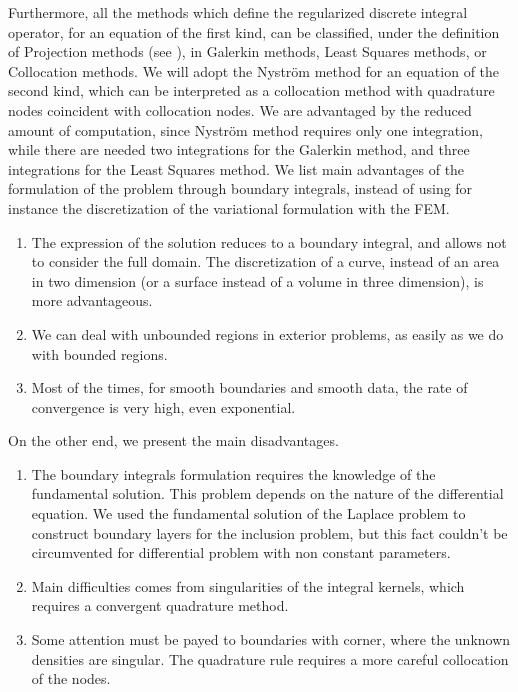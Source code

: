 \documentclass[10pt, a4paper, twoside, openright]{book}
\theoremstyle{definition}
\theoremstyle{plain}
\theoremstyle{plain}
\theoremstyle{plain}
\theoremstyle{plain}
\theoremstyle{plain}
\theoremstyle{plain}
\theoremstyle{plain}
\theoremstyle{plain}
\begin{document}
Furthermore, all the methods which define the regularized discrete integral operator, 
for an equation of the first kind,
can be classified, under the definition of Projection methods 
(see \cite{kirsch:book}), in Galerkin methods, Least Squares methods, or 
Collocation methods. We will adopt the Nystr\"{o}m method for an equation 
of the second kind, which can be interpreted as a 
collocation method with quadrature nodes coincident with collocation nodes. 
We are advantaged by the reduced amount of computation, since Nystr\"{o}m method requires only 
one integration, while there are needed two integrations for the Galerkin method, and three 
integrations for the Least Squares method.
We list main advantages of the formulation of the problem through boundary integrals, 
instead of using for instance the discretization of the variational formulation with the FEM.
\begin{enumerate}
 \item The expression of the solution reduces to a boundary integral,
 and allows not to consider the full domain. The discretization of a curve, instead of an area 
 in two dimension (or a surface instead of a volume in three dimension), is more advantageous.
 \item We can deal with unbounded regions in exterior problems, as easily as we do with bounded regions.
 \item Most of the times, for smooth boundaries and smooth data, the rate of convergence is very high, even exponential.
\end{enumerate}
On the other end, we present the main disadvantages.
\begin{enumerate}
 \item The boundary integrals formulation requires the knowledge of the fundamental solution. 
 This problem depends on the nature of the differential equation. 
 We used the fundamental solution of the Laplace problem to construct boundary layers 
 for the inclusion problem, but this fact couldn't be circumvented for 
 differential problem with non constant parameters.
 \item Main difficulties comes from singularities of the integral kernels, 
 which requires a convergent quadrature method.
 \item Some attention must be payed to boundaries with corner, 
 where the unknown densities are singular. The quadrature rule requires a more 
 careful collocation of the nodes.
\end{enumerate}
\end{document}
